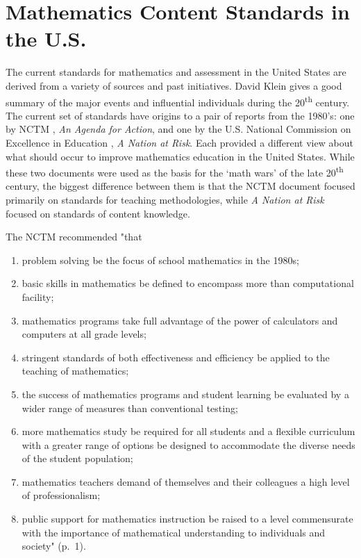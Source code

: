 \documentclass[
]{book}
\theoremstyle{definition}
\theoremstyle{definition}
\theoremstyle{definition}
\theoremstyle{remark}
\begin{document}
\hypertarget{mathematics-content-standards-in-the-u.s.}{%
\section{Mathematics Content Standards in the U.S.}\label{mathematics-content-standards-in-the-u.s.}}

The current standards for mathematics and assessment in the United States are derived from a variety of sources and past initiatives. David Klein \citeyearpar{Klein2003} gives a good summary of the major events and influential individuals during the 20\textsuperscript{th} century. The current set of standards have origins to a pair of reports from the 1980's: one by NCTM \citeyearpar{NCTM1980}, \emph{An Agenda for Action}, and one by the U.S. National Commission on Excellence in Education \citeyearpar{NCEE1983}, \emph{A Nation at Risk}. Each provided a different view about what should occur to improve mathematics education in the United States. While these two documents were used as the basis for the `math wars' of the late 20\textsuperscript{th} century, the biggest difference between them is that the NCTM document focused primarily on standards for teaching methodologies, while \emph{A Nation at Risk} focused on standards of content knowledge.

The NCTM \citeyearpar{NCTM1980} recommended "that

\begin{enumerate}
\def\labelenumi{\arabic{enumi}.}
\item
  problem solving be the focus of school mathematics in the 1980s;
\item
  basic skills in mathematics be defined to encompass more than computational facility;
\item
  mathematics programs take full advantage of the power of calculators and computers at all grade levels;
\item
  stringent standards of both effectiveness and efficiency be applied to the teaching of mathematics;
\item
  the success of mathematics programs and student learning be evaluated by a wider range of measures than conventional testing;
\item
  more mathematics study be required for all students and a flexible curriculum with a greater range of options be designed to accommodate the diverse needs of the student population;
\item
  mathematics teachers demand of themselves and their colleagues a high level of professionalism;
\item
  public support for mathematics instruction be raised to a level commensurate with the importance of mathematical understanding to individuals and society" (p.~1).
\end{enumerate}
\end{document}
